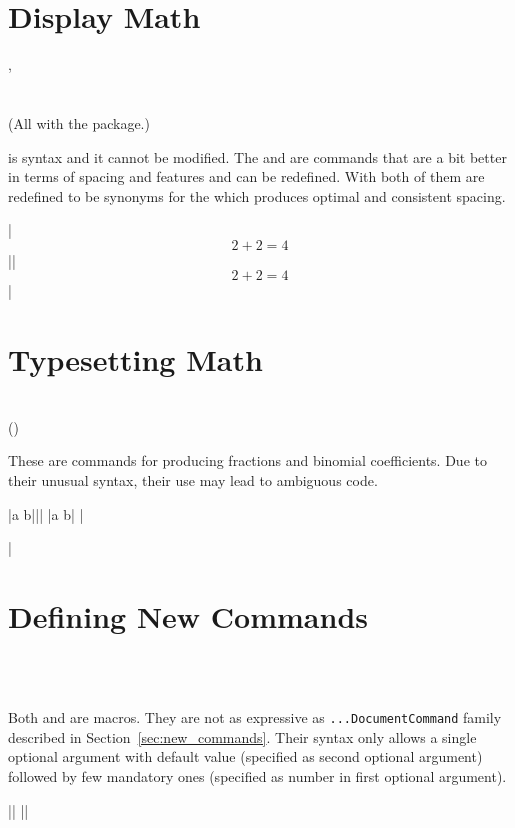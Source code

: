 \section{Display Math}
\instead{
\ai{\&\&}
} {
\ci{[}, \ci{]} \\
\\
\\
(All with the  package.)
}

\ai{\&\&} is  syntax and it cannot be modified. The
 and \ci{[} are  commands that are a bit better
in terms of spacing and features and can be redefined. With  both
of them are redefined to be synonyms for the  which produces
optimal and consistent spacing.

\chto|$$ 2 + 2 = 4 $$||\[ 2 + 2 = 4 \]| %

\section{Typesetting Math}
 {
   \\
   ()
}

These are  commands for producing fractions and binomial
coefficients. Due to their unusual syntax, their use may lead to ambiguous
code.
\begin{chktexignore}
\chto|{a \over b}|||
\chto|{a \choose b}|
|\usepackage{amsmath}
|
\end{chktexignore}

\section{Defining New Commands}\label{sec:def}
 {
   \\
   \\
}

Both  and  are  macros. They
are not as expressive as \texttt{...DocumentCommand} family  %
described in Section~\ref{sec:new_commands}. Their syntax only allows a single
optional argument with default value (specified as second optional argument)
followed by few mandatory ones (specified as number in first optional
argument).
\begin{chktexignore}
  \vchto|\newcommand{\foo}[4][bar]{ ... }|
  ||
\end{chktexignore}

